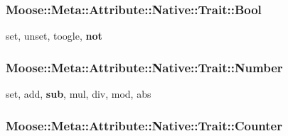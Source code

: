 \documentclass[twocolumn]{article}
\newenvironment{Shaded}{}{}
\newcommand{\KeywordTok}[1]{\textcolor[rgb]{0.00,0.44,0.13}{\textbf{{#1}}}}
\newcommand{\DataTypeTok}[1]{\textcolor[rgb]{0.56,0.13,0.00}{{#1}}}
\newcommand{\FunctionTok}[1]{\textcolor[rgb]{0.02,0.16,0.49}{{#1}}}
\newcommand{\NormalTok}[1]{{#1}}
\begin{document}
\subsubsection{Moose::Meta::Attribute::Native::Trait::Bool}\label{moosemetaattributenativetraitbool}

\begin{Shaded}
\begin{Highlighting}[]
\NormalTok{set, unset, toogle, }\KeywordTok{not}
\end{Highlighting}
\end{Shaded}

\subsubsection{Moose::Meta::Attribute::Native::Trait::Number}\label{moosemetaattributenativetraitnumber}

\begin{Shaded}
\begin{Highlighting}[]
\NormalTok{set, add, }\KeywordTok{sub}\NormalTok{, mul, div, mod, }\FunctionTok{abs}
\end{Highlighting}
\end{Shaded}

\subsubsection{Moose::Meta::Attribute::Native::Trait::Counter}\label{moosemetaattributenativetraitcounter}

\begin{Shaded}
\end{Shaded}
\end{document}
